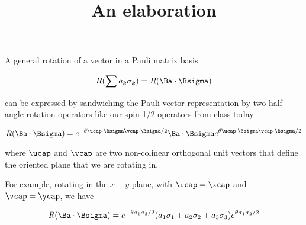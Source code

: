 
%

\title{An elaboration}

\beginArtNoToc

%


A general rotation of a vector in a Pauli matrix basis

\begin{equation}\label{eqn:qmTwoL15:n}
R(\sum a_k \sigma_k) = R( \Ba \cdot \Bsigma)
\end{equation}

can be expressed by sandwiching the Pauli vector representation by two half angle rotation operators like our spin 1/2 operators from class today

\begin{equation}\label{eqn:qmTwoL15:n}
R( \Ba \cdot \Bsigma) = e^{-\theta \ucap \cdot \Bsigma \vcap \cdot \Bsigma/2} \Ba \cdot \Bsigma e^{\theta \ucap \cdot \Bsigma \vcap \cdot \Bsigma/2}
\end{equation}

where $\ucap$ and $\vcap$ are two non-colinear orthogonal unit vectors that define the oriented plane that we are rotating in.

For example, rotating in the $x-y$ plane, with $\ucap = \xcap$ and $\vcap = \ycap$, we have

\begin{equation}\label{eqn:qmTwoL15:n}
R( \Ba \cdot \Bsigma) 
= e^{-\theta \sigma_1 \sigma_2/2} (a_1 \sigma_1 + a_2 \sigma_2 + a_3 \sigma_3) e^{\theta \sigma_1 \sigma_2/2} 
\end{equation}

